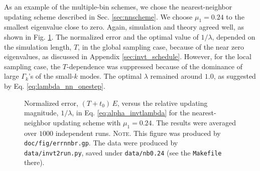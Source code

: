 \documentclass[reprint, floatfix]{revtex4-1}
\newcommand{\note}[1]{{\color{DarkGreen}\footnotesize \textsc{Note.} #1}}
\begin{document}

As an example of the multiple-bin schemes,
we chose the nearest-neighbor updating scheme
described in Sec. \ref{sec:nnscheme}.
%
We choose $\mu_1 = 0.24$ to the smallest eigenvalue
close to zero.
%
Again, simulation and theory agreed well,
as shown in Fig. \ref{fig:errnnbr}.
%
The normalized error
and the optimal value of $1/\lambda$,
depended on the simulation length, $T$,
in the global sampling case,
because of the near zero eigenvalues,
as discussed in Appendix \ref{sec:invt_schedule}.
%
%
However, for the local sampling case,
the $T$-dependence was suppressed
because of the dominance of large $\Gamma_k$'s
of the small-$k$ modes.
%
The optimal $\lambda$ remained around $1.0$,
as suggested by Eq. \eqref{eq:lambda_nn_onestep}.





\begin{figure}[h]
\begin{center}
  \caption{
    \label{fig:errnnbr}
    Normalized error, $(T + t_0) \, E$,
    versus the %
    relative updating magnitude,
    $1/\lambda$,
    in Eq. \eqref{eq:alpha_invtlambda}
    for the nearest-neighbor updating scheme with $\mu_1 = 0.24$.
    The results were averaged over $1000$ independent runs.
    \note{This figure was produced by \texttt{doc/fig/errnnbr.gp}.
      The data were produced by \texttt{data/invt2run.py},
      saved under \texttt{data/nb0.24}
      (see the \texttt{Makefile} there).
    }%
  }
\end{center}
\end{figure}
\end{document}
